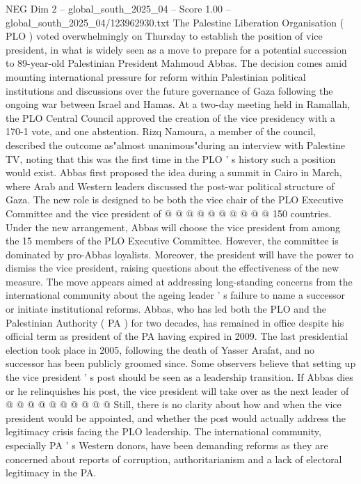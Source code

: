 \begin{textsample}{NEG Dim 2 – global\_south\_2025\_04 – Score 1.00 – global\_south\_2025\_04/123962930.txt}  \label{ex:f2_neg_177}
The Palestine Liberation Organisation ( PLO ) voted overwhelmingly on Thursday to establish the position of vice president, in what is widely seen as a move to prepare for a potential succession to 89-year-old Palestinian President Mahmoud Abbas.
The decision comes amid mounting international pressure for reform within Palestinian political institutions and discussions over the future governance of Gaza following the ongoing war between Israel and Hamas.
At a two-day meeting held in Ramallah, the PLO Central Council approved the creation of the vice presidency with a 170-1 vote, and one abstention.
Rizq Namoura, a member of the council, described the outcome as"almost unanimous"during an interview with Palestine TV, noting that this was the first time in the PLO ' s history such a position would exist.
Abbas first proposed the idea during a summit in Cairo in March, where Arab and Western leaders discussed the post-war political structure of Gaza.
The new role is designed to be both the vice chair of the PLO Executive Committee and the vice president of @ @ @ @ @ @ @ @ @ @ 150 countries.
Under the new arrangement, Abbas will choose the vice president from among the 15 members of the PLO Executive Committee.
However, the committee is dominated by pro-Abbas loyalists.
Moreover, the president will have the power to dismiss the vice president, raising questions about the effectiveness of the new measure.
The move appears aimed at addressing long-standing concerns from the international community about the ageing leader ' s failure to name a successor or initiate institutional reforms.
Abbas, who has led both the PLO and the Palestinian Authority ( PA ) for two decades, has remained in office despite his official term as president of the PA having expired in 2009.
The last presidential election took place in 2005, following the death of Yasser Arafat, and no successor has been publicly groomed since.
Some observers believe that setting up the vice president ' s post should be seen as a leadership transition.
If Abbas dies or he relinquishes his post, the vice president will take over as the next leader of @ @ @ @ @ @ @ @ @ @ Still, there is no clarity about how and when the vice president would be appointed, and whether the post would actually address the legitimacy crisis facing the PLO leadership.
The international community, especially PA ' s Western donors, have been demanding reforms as they are concerned about reports of corruption, authoritarianism and a lack of electoral legitimacy in the PA.

\end{textsample}
